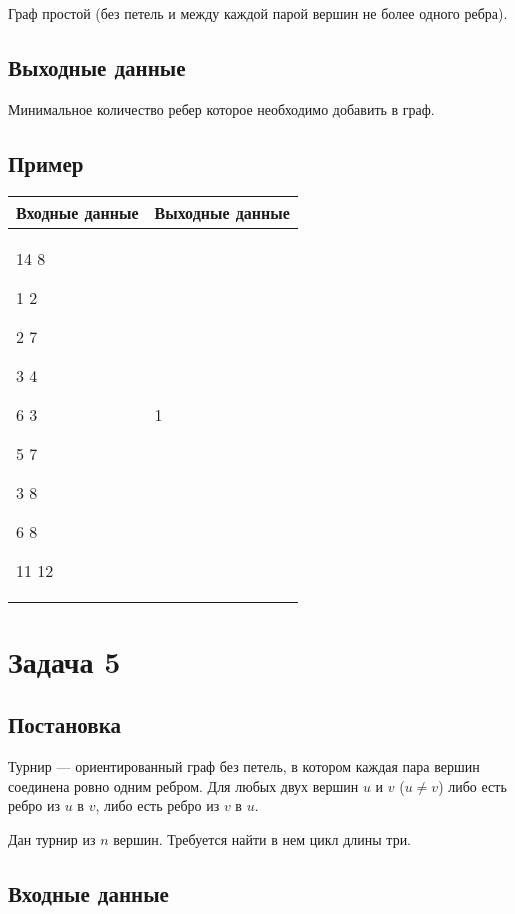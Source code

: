 \documentclass{extarticle}
\begin{document}
Граф простой (без петель и между каждой парой вершин не более одного ребра).

\subsection*{Выходные данные}
\label{sec:org1ab7414}

Минимальное количество ребер которое необходимо добавить в граф.

\subsection*{Пример}
\label{sec:org25482f8}

\begin{table}[H]
\begin{center}
\begin{tabular}{|m{4cm}|m{4cm}|}
\hline
Входные данные & Выходные данные \\ \hline
14 8

1 2

2 7

3 4

6 3

5 7

3 8

6 8

11 12
&
1
\\ \hline
\end{tabular}
\end{center}
\end{table}


\pagebreak

\section*{Задача 5}
\label{sec:org3bacd52}
\subsection*{Постановка}
\label{sec:org30bb0a3}

Турнир — ориентированный граф без петель, в котором каждая
пара вершин соединена ровно одним ребром.
Для любых двух вершин \(u\) и \(v\) (\(u \neq v\)) либо есть ребро из
\(u\) в \(v\), либо есть ребро из \(v\) в \(u\).

Дан турнир из \(n\) вершин. Требуется найти в нем цикл длины три.

\subsection*{Входные данные}
\label{sec:orge2c6641}
\end{document}
